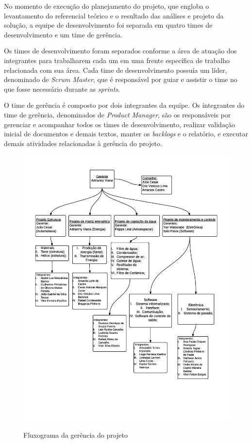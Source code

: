       No momento de execução do planejamento do projeto, que engloba o levantamento do referencial teórico e o resultado das análises
      e projeto da solução, a equipe de desenvolvimento foi separada em quatro times de desenvolvimento e um time de gerência.
      
      Os times de desenvolvimento foram separados conforme a área de atuação dos integrantes para trabalharem cada um em uma frente
      específica de trabalho relacionada com sua área. Cada time de desenvolvimento possuía um líder, denominado de 
      \textit{Scrum Master}, que é responsável por guiar e assistir o time no que fosse necessário durante as \textit{sprints}.
      
      O time de gerência é composto por dois integrantes da equipe.
      Os integrantes do time de gerência, denominados de \textit{Product Manager}, são os responsáveis por gerenciar e acompanhar 
      todos os times de desenvolvimento, realizar validação inicial de documentos e demais textos,
      manter os \textit{backlogs} e o relatório, e executar demais atividades relacionadas à gerência do projeto.
    
    \begin{figure}[!h]
      \centering
      \includegraphics[scale = 0.27]{editaveis/figuras/Fluxograma_gerencia}
      \label{fluxograma_gerencia_projeto}
      \caption{Fluxograma da gerência do projeto}
    \end{figure}
    \FloatBarrier
    
